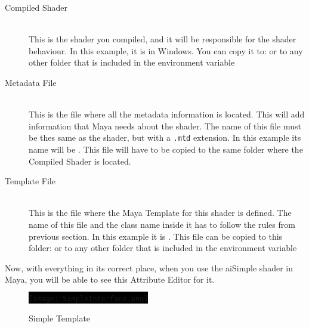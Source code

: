 \begin{description}

\item[Compiled Shader] \hfill \\
This is the shader you compiled, and it will be responsible for the shader behaviour. In this example, it is 
in Windows. You can copy it to:
 or to any other folder that is included in the environment variable
\\

\item[Metadata File] \hfill \\
This is the file where all the metadata information is located. This will add information that Maya needs about the shader. The name of this file must be thes same as the shader,
but with a \texttt{.mtd} extension. In this example its name will be . This file will have to be copied to the same folder
where the Compiled Shader is located.\\

\item[Template File] \hfill \\
This is the file where the Maya Template for this shader is defined. The name of this file and the class name inside it has to follow the rules from previous section.
In this example it is . This file can be copied to this folder:
or to any other folder that is included in the environment variable
\\

\end{description}

Now, with everything in its correct place, when you use the aiSimple shader in Maya, you will be able to see this Attribute Editor for it.

\begin{figure}[H]
\centering
\colorbox{black}{\texttt{[image: SimpleInterface.png]}}
\caption{Simple Template}
\label{SimpleTemplate}
\end{figure}


